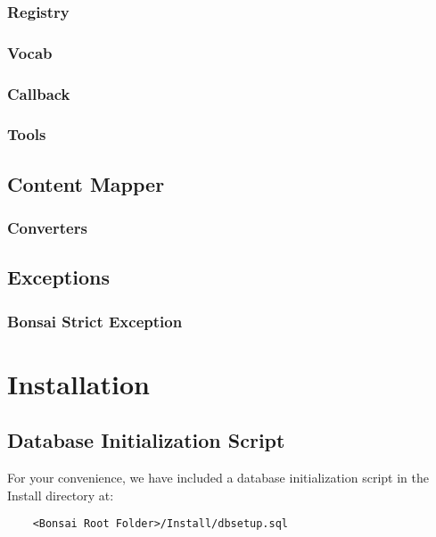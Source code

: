 \documentclass[]{book}
\begin{document}
\subsection{Registry}

\subsection{Vocab}

\subsection{Callback}

\subsection{Tools}

\section{Content Mapper}

\subsection{Converters}

\section{Exceptions}

\subsection{Bonsai Strict Exception}
\label{sec:bonsaiStructExecption}

\chapter{Installation}

\section{Database Initialization Script}
\label{sec:dbinit}

For your convenience, we have included a database initialization script in the Install directory at:
\begin{verbatim}
    <Bonsai Root Folder>/Install/dbsetup.sql
\end{verbatim}
\end{document}

